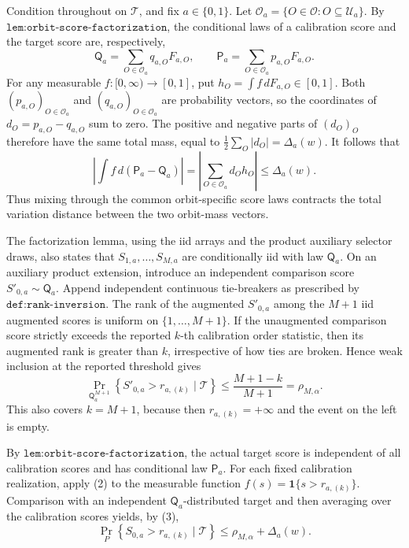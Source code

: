 Condition throughout on \(\mathcal T\), and fix \(a\in\{0,1\}\). Let \(\mathcal O_a=\{O\in\mathcal O:O\subseteq\mathcal U_a\}\). By \(\texttt{lem:orbit-score-factorization}\), the conditional laws of a calibration score and the target score are, respectively,
\[
\mathsf Q_a=\sum_{O\in\mathcal O_a}q_{a,O}F_{a,O},\qquad \mathsf P_a=\sum_{O\in\mathcal O_a}p_{a,O}F_{a,O}.
\tag{1}
\]
For any measurable \(f:[0,\infty)\to[0,1]\), put \(h_O=\int f\,dF_{a,O}\in[0,1]\). Both \((p_{a,O})_{O\in\mathcal O_a}\) and \((q_{a,O})_{O\in\mathcal O_a}\) are probability vectors, so the coordinates of \(d_O=p_{a,O}-q_{a,O}\) sum to zero. The positive and negative parts of \((d_O)_O\) therefore have the same total mass, equal to \(\frac12\sum_O|d_O|=\Delta_a(w)\). It follows that
\[
\left|\int f\,d(\mathsf P_a-\mathsf Q_a)\right|
=\left|\sum_{O\in\mathcal O_a}d_Oh_O\right|
\le \Delta_a(w).
\tag{2}
\]
Thus mixing through the common orbit-specific score laws contracts the total variation distance between the two orbit-mass vectors.

The factorization lemma, using the iid arrays and the product auxiliary selector draws, also states that \(S_{1,a},\ldots,S_{M,a}\) are conditionally iid with law \(\mathsf Q_a\). On an auxiliary product extension, introduce an independent comparison score \(S'_{0,a}\sim\mathsf Q_a\). Append independent continuous tie-breakers as prescribed by \(\texttt{def:rank-inversion}\). The rank of the augmented \(S'_{0,a}\) among the \(M+1\) iid augmented scores is uniform on \(\{1,\ldots,M+1\}\). If the unaugmented comparison score strictly exceeds the reported \(k\)-th calibration order statistic, then its augmented rank is greater than \(k\), irrespective of how ties are broken. Hence weak inclusion at the reported threshold gives
\[
\Pr_{\mathsf Q_a^{M+1}}\!\left\{S'_{0,a}>r_{a,(k)}\mid\mathcal T\right\}
\le \frac{M+1-k}{M+1}
=\rho_{M,\alpha}.
\tag{3}
\]
This also covers \(k=M+1\), because then \(r_{a,(k)}=+\infty\) and the event on the left is empty.

By \(\texttt{lem:orbit-score-factorization}\), the actual target score is independent of all calibration scores and has conditional law \(\mathsf P_a\). For each fixed calibration realization, apply (2) to the measurable function \(f(s)=\mathbf 1\{s>r_{a,(k)}\}\). Comparison with an independent \(\mathsf Q_a\)-distributed target and then averaging over the calibration scores yields, by (3),
\[
\Pr_P\!\left\{S_{0,a}>r_{a,(k)}\mid\mathcal T\right\}
\le \rho_{M,\alpha}+\Delta_a(w).
\tag{4}
\]

